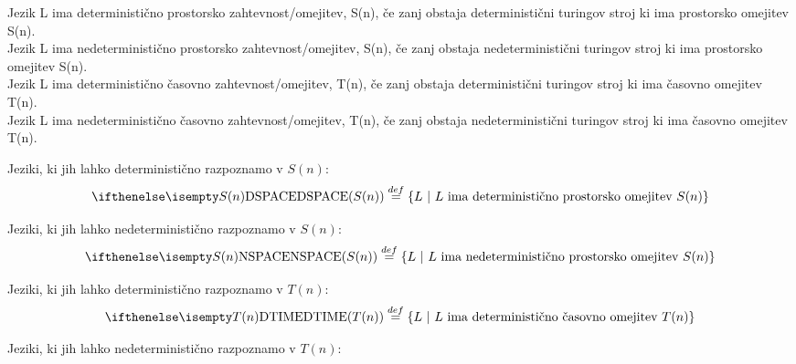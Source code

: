 \documentclass[10pt,a4paper,oneside]{book}
\begin{document}
\begin{neurejeno}

Jezik L ima deterministično prostorsko zahtevnost/omejitev, S(n), če zanj obstaja deterministični turingov stroj ki ima prostorsko omejitev S(n).\\
Jezik L ima nedeterministično prostorsko zahtevnost/omejitev, S(n), če zanj obstaja nedeterministični turingov stroj ki ima prostorsko omejitev S(n).\\
Jezik L ima deterministično časovno zahtevnost/omejitev, T(n), če zanj obstaja deterministični turingov stroj ki ima časovno omejitev T(n).\\
Jezik L ima nedeterministično časovno zahtevnost/omejitev, T(n), če zanj obstaja nedeterministični turingov stroj ki ima časovno omejitev T(n).
\br
{}
\begin{items}
\item Jeziki, ki jih lahko deterministično razpoznamo v $S(n)$:
\[ \DSPACE{S(n)} \PoDef \{ L \| L \mbox{ ima deterministično prostorsko omejitev } S(n) \} \]
\item Jeziki, ki jih lahko nedeterministično razpoznamo v $S(n)$:
\[ \NSPACE{S(n)} \PoDef \{ L \| L \mbox{ ima nedeterministično prostorsko omejitev } S(n) \} \]
\item Jeziki, ki jih lahko deterministično razpoznamo v $T(n)$:
\[ \DTIME{T(n)} \PoDef \{ L \| L \mbox{ ima deterministično časovno omejitev } T(n) \} \]
\item Jeziki, ki jih lahko nedeterministično razpoznamo v $T(n)$:

\end{items}
\end{neurejeno}
\end{document}
